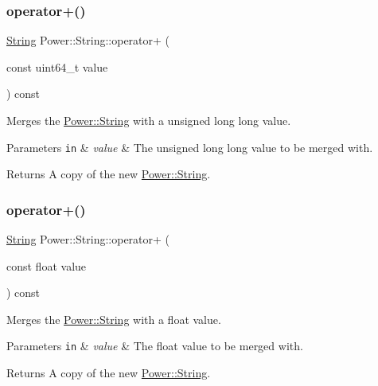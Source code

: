 \subsubsection{\texorpdfstring{operator+()}{operator+()}\hspace{0.1cm}{\footnotesize\ttfamily [9/11]}}
{\footnotesize\ttfamily \hyperlink{class_power_1_1_string}{String} Power\+::\+String\+::operator+ (\begin{DoxyParamCaption}\item[{const uint64\+\_\+t}]{value }\end{DoxyParamCaption}) const\hspace{0.3cm}{\ttfamily [inline]}}



Merges the \hyperlink{class_power_1_1_string}{Power\+::\+String} with a unsigned long long value. 


\begin{DoxyParams}[1]{Parameters}
\mbox{\tt in}  & {\em value} & The unsigned long long value to be merged with. \\
\hline
\end{DoxyParams}
\begin{DoxyReturn}{Returns}
A copy of the new \hyperlink{class_power_1_1_string}{Power\+::\+String}. 
\end{DoxyReturn}
\mbox{\label{class_power_1_1_string_a011603e62e9254d7b2a95314ddaca716}} 
\subsubsection{\texorpdfstring{operator+()}{operator+()}\hspace{0.1cm}{\footnotesize\ttfamily [10/11]}}
{\footnotesize\ttfamily \hyperlink{class_power_1_1_string}{String} Power\+::\+String\+::operator+ (\begin{DoxyParamCaption}\item[{const float}]{value }\end{DoxyParamCaption}) const\hspace{0.3cm}{\ttfamily [inline]}}



Merges the \hyperlink{class_power_1_1_string}{Power\+::\+String} with a float value. 


\begin{DoxyParams}[1]{Parameters}
\mbox{\tt in}  & {\em value} & The float value to be merged with. \\
\hline
\end{DoxyParams}
\begin{DoxyReturn}{Returns}
A copy of the new \hyperlink{class_power_1_1_string}{Power\+::\+String}. 
\end{DoxyReturn}
\mbox{\label{class_power_1_1_string_a0957d2856d8e5693a49fef4812629459}} 
